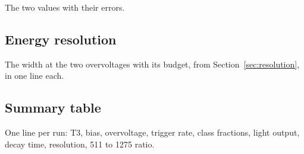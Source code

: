 \documentclass[11pt]{article}
\begin{document}
The two values with their errors.

\subsection{Energy resolution}

The width at the two overvoltages with its budget, from
Section~\ref{sec:resolution}, in one line each.

\subsection{Summary table}

One line per run: T3, bias, overvoltage, trigger rate, class fractions,
light output, decay time, resolution, 511 to 1275 ratio.
\end{document}
